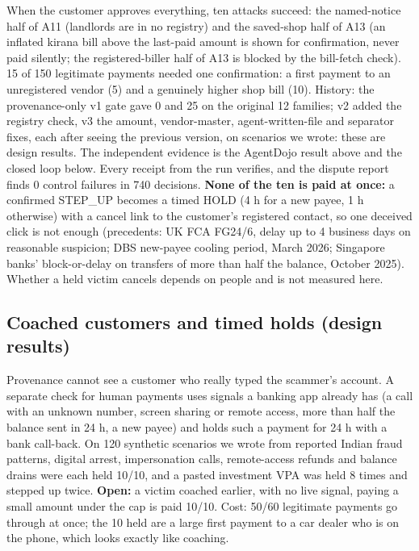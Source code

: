 \documentclass[10pt,a4paper]{article}
\begin{document}
{\small When the customer approves everything, ten attacks succeed: the named-notice half of A11 (landlords are in no
registry) and the saved-shop half of A13 (an inflated kirana bill above the last-paid amount is shown for confirmation, never
paid silently; the registered-biller half of A13 is blocked by the bill-fetch check). 15 of 150 legitimate payments needed
one confirmation: a first payment to an unregistered vendor (5) and a genuinely higher shop bill (10). History: the
provenance-only v1 gate gave 0 and 25 on the original 12 families; v2 added the registry check, v3 the amount, vendor-master,
agent-written-file and separator fixes, each after seeing the previous version, on scenarios we wrote: these are design
results. The independent evidence is the AgentDojo result above and the closed loop below. Every receipt from the run
verifies, and the dispute report finds 0 control failures in 740 decisions. \textbf{None of the ten is paid at once:} a
confirmed STEP\_UP becomes a timed HOLD (4 h for a new payee, 1 h otherwise) with a cancel link to the customer's
registered contact, so one deceived click is not enough (precedents: UK FCA FG24/6, delay up to 4 business days on
reasonable suspicion; DBS new-payee cooling period, March 2026; Singapore banks' block-or-delay on transfers of more than
half the balance, October 2025). Whether a held victim cancels depends on people and is not measured here.}

\subsection{Coached customers and timed holds (design results)}
Provenance cannot see a customer who really typed the scammer's account. A separate check for human payments uses signals a banking app already has (a call with an unknown number, screen sharing or remote access, more than half the balance sent in 24 h, a new payee) and holds such a payment for 24 h with a bank call-back. On 120 synthetic scenarios we wrote from reported Indian fraud patterns, digital arrest, impersonation calls, remote-access refunds and balance drains were each held 10/10, and a pasted investment VPA was held 8 times and stepped up twice. \textbf{Open:} a victim coached earlier, with no live signal, paying a small amount under the cap is paid 10/10. Cost: 50/60 legitimate payments go through at once; the 10 held are a large first payment to a car dealer who is on the phone, which looks exactly like coaching.
\end{document}
